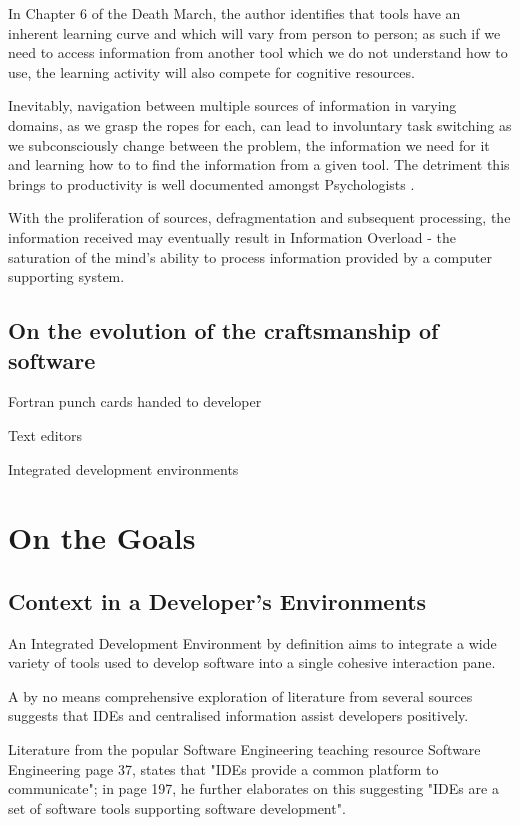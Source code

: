 In Chapter 6 of the Death March, the author identifies that tools have an inherent learning curve and which will vary from person to person; as such if we need to access information from another tool which we do not understand how to use, the learning activity will also compete for cognitive resources.

Inevitably, navigation between multiple sources of information in varying domains, as we grasp the ropes for each, can lead to involuntary task switching as we subconsciously change between the problem, the information we need for it and learning how to to find the information from a given tool. The detriment this brings to productivity is well documented amongst Psychologists \parencite{apaMultitasking}.

With the proliferation of sources, defragmentation and subsequent processing, the information received may eventually result in Information Overload - the saturation of the mind's ability to process information provided by a computer supporting system.


\subsection{On the evolution of the craftsmanship of software}

Fortran punch cards handed to developer

Text editors

Integrated development environments 


\section{On the Goals}

\subsection{Context in a Developer's Environments}

An Integrated Development Environment by definition aims to integrate a wide variety of tools used to develop software into a single cohesive interaction pane. 

A by no means comprehensive exploration of literature from several sources suggests that IDEs and centralised information assist developers positively. 

Literature from the popular Software Engineering teaching resource Software Engineering \parencite{Sommerville:2010:SE:1841764} page 37, states that "IDEs provide a common platform to communicate"; in page 197, he further elaborates on this suggesting "IDEs are a set of software tools supporting software development".

